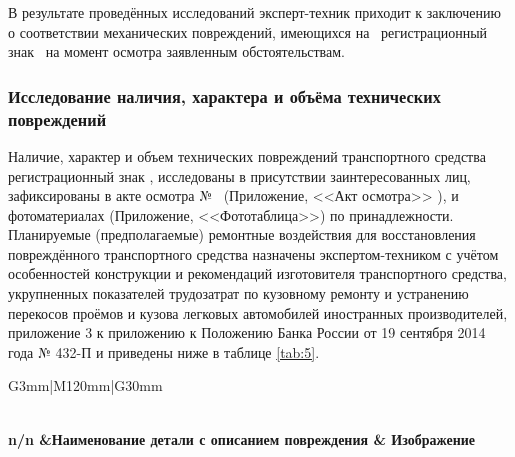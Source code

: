 В результате проведённых исследований эксперт-техник приходит к заключению о соответствии механических повреждений, имеющихся на \, регистрационный знак \, на момент осмотра заявленным обстоятельствам. 


\subsubsection{Исследование наличия, характера и объёма технических повреждений}

  Наличие, характер и объем технических повреждений транспортного средства \tc\, регистрационный знак \grz, исследованы в присутствии заинтересованных лиц,  зафиксированы в акте осмотра № \NomerDoc\,  (Приложение, <<Акт осмотра>> ),  и фотоматериалах (Приложение, <<Фототаблица>>) по принадлежности. Планируемые (предполагаемые) ремонтные воздействия для восстановления повреждённого  транспортного средства назначены экспертом-техником с учётом особенностей конструкции и рекомендаций изготовителя  транспортного средства, укрупненных показателей трудозатрат по кузовному ремонту и устранению перекосов проёмов и кузова легковых автомобилей иностранных производителей, приложение 3 к приложению к Положению Банка России от 19 сентября 2014 года № 432-П и приведены ниже в таблице \ref{tab:5}.
 
  
  \begin{longtable}{G{3mm}|M{120mm}|G{30mm}}
      \caption[]{\footnotesize {Повреждения автомобиля, установленные при его осмотре}} 
      \label{tab:5}\\ 
      \hline 
      \hline  \toprule 
\bf  {\footnotesize  n/n}  &\bf {\small Наименование  детали с описанием повреждения} & \bf {\small Изображение} \\   \hline\hline  \toprule \endhead 




      
  \end{longtable}\setcounter{rownum}{0}
  
